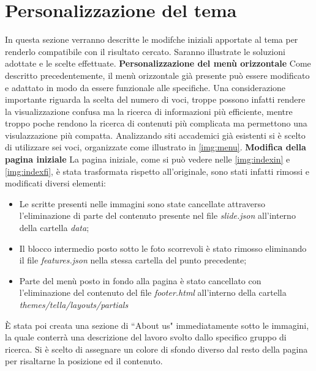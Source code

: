 \documentclass[target=bach,aauheader=]{thud}
\begin{document}
\section{Personalizzazione del tema}
In questa sezione verranno descritte le modifche iniziali apportate al tema per renderlo compatibile con il risultato cercato. Saranno illustrate le soluzioni adottate e le scelte effettuate. 
\newline \newline
\textbf{{\fontsize{12}{14}\selectfont Personalizzazione del menù orizzontale}}
\newline \newline
Come descritto precedentemente, il menù orizzontale già presente può essere modificato e adattato in modo da essere funzionale alle specifiche. 
Una considerazione importante riguarda la scelta del numero di voci, troppe possono infatti rendere la visualizzazione confusa ma la ricerca di informazioni più efficiente, mentre troppo poche rendono la ricerca di contenuti più complicata ma permettono una visulazzazione più compatta. 
Analizzando siti accademici già esistenti si è scelto di utilizzare sei voci, organizzate come illustrato in \cref{img:menu}.
\newline \newline
\textbf{{\fontsize{12}{14}\selectfont Modifica della pagina iniziale}}
\newline \newline
La pagina iniziale, come si può vedere nelle \cref{img:indexin} e \cref{img:indexfi}, è stata trasformata rispetto all'originale, sono stati infatti rimossi e modificati diversi elementi: 
\begin{itemize}
    \item Le scritte presenti nelle immagini sono state cancellate attraverso l'eliminazione di parte del contenuto presente nel file \textit{slide.json} all'interno della cartella \textit{data};
    \item Il blocco intermedio posto sotto le foto scorrevoli è stato rimosso eliminando il file \textit{features.json} nella stessa cartella del punto precedente; 
    \item Parte del menù posto in fondo alla pagina è stato cancellato con l'eliminazione del contenuto del file \textit{footer.html} all'interno della cartella \textit{themes/tella/layouts/partials}
\end{itemize}
È stata poi creata una sezione di ``About us" immediatamente sotto le immagini, la quale conterrà una descrizione del lavoro svolto dallo specifico gruppo di ricerca. Si è scelto di assegnare un colore di sfondo diverso dal resto della pagina per risaltarne la posizione ed il contenuto.
\end{document}

